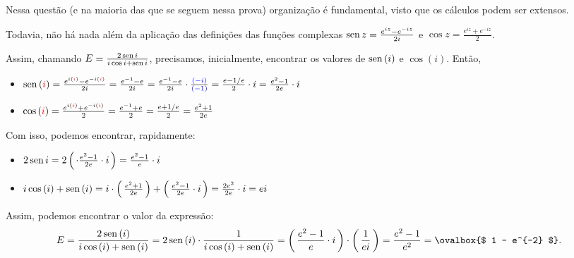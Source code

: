 \begin{solution}
 Nessa questão (e na maioria das que se seguem nessa prova) organização é 
 fundamental, visto que os cálculos podem ser extensos.

 Todavia, não há nada além da aplicação das definições das funções complexas
 $ \operatorname{sen}{z} = \frac{e^{iz} -  e^{-iz}}{2i} $ e $ \cos{z} = \frac{e^{iz} + e^{-iz}}{2} $.
 
 Assim, chamando $ E = \frac{2 \operatorname{sen}{i}}{i \cos{i} + \operatorname{sen}{i}} $, precisamos, 
 inicialmente, encontrar os valores de $ \operatorname{sen}{(i)} $ e $ \cos{(i)} $.
 Então,
 
 \begin{itemize}
  \item 
   $
    \operatorname{sen}{(\textcolor{red}{i})} 
    = \frac{e^{i (\textcolor{red}{i})} - e^{-i (\textcolor{red}{i})}}{2i} 
    = \frac{e^{-1} - e}{2i}
    = \frac{e^{-1} - e}{2i} \cdot \frac{\textcolor{blue}{(-i)}}{\textcolor{blue}{(-1)}}
    = \frac{e - 1/e}{2} \cdot i
    = \frac{e^2 - 1}{2e} \cdot i
   $
  \item
   $
    \cos{(\textcolor{red}{i})}
    = \frac{e^{i(\textcolor{red}{i})} + e^{-i(\textcolor{red}{i})}}{2}
    = \frac{e^{-1} + e}{2}
    = \frac{e + 1/e}{2}
    = \frac{e^2 + 1}{2e}
   $
 \end{itemize}
 
 Com isso, podemos encontrar, rapidamente:
 \begin{itemize}
  \item 
   $
    2 \operatorname{sen}{i} 
    = 2 \left(\, \cdot \frac{e^2 - 1}{2e} \cdot i \,\right)
    = \frac{e^2 - 1}{e} \cdot i
   $
  \item
  $
   i \cos{(i)} + \operatorname{sen}{(i)} 
   = i \cdot \left(\, \frac{e^2 + 1}{2e} \,\right) + \left(\, \frac{e^2 - 1}{2e} \cdot i \,\right)
   = \frac{2 e^2}{2 e} \cdot i
   = ei
  $
 \end{itemize}
 
 Assim, podemos encontrar o valor da expressão:
 \[
  E = \frac{2 \sen{(i)}}{i \cos{(i)} + \sen{(i)}} 
    = 2 \sen{(i)} \cdot \frac{1}{i \cos{(i)} + \sen{(i)}}
    = \left(\, \frac{e^2 - 1}{e} \cdot i \,\right) \cdot \left(\, \frac{1}{ei} \,\right) 
    = \frac{e^2 - 1}{e^2}
    = \ovalbox{$ 1 - e^{-2} $}.
 \]
\end{solution}